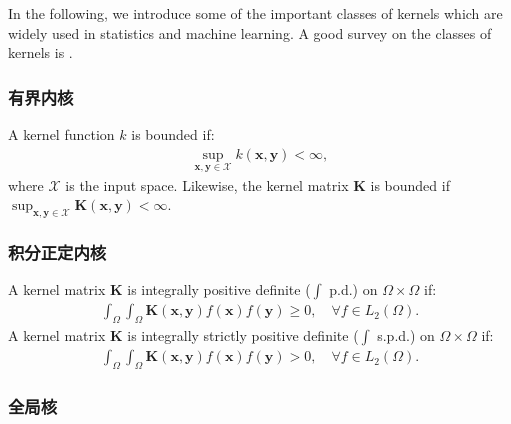 \documentclass[lang=cn,10pt]{gorgeousnbook}
\numberwithin{equation}{section}%
\numberwithin{figure}{section}%
\begin{document}
In the following, we introduce some of the important classes of kernels which are widely used in statistics and machine learning. A good survey on the classes of kernels is \cite{genton2001classes}.


\subsubsection{有界内核}

\begin{definition}
A kernel function $k$ is bounded if:
\begin{align}
\sup_{\boldsymbol{x}, \boldsymbol{y} \in \mathcal{X}} k(\boldsymbol{x}, \boldsymbol{y}) < \infty, 
\end{align}
where $\mathcal{X}$ is the input space. Likewise, the kernel matrix $\boldsymbol{K}$ is bounded if $\sup_{\boldsymbol{x}, \boldsymbol{y} \in \mathcal{X}} \boldsymbol{K}(\boldsymbol{x}, \boldsymbol{y}) < \infty$.
\end{definition}

\subsubsection{积分正定内核} \label{section_integrally_positive_definite_kernels}

\begin{definition}
A kernel matrix $\boldsymbol{K}$ is integrally positive definite ($\int$ p.d.) on $\Omega \times \Omega$ if:
\begin{align}
\int_\Omega \int_\Omega \boldsymbol{K}(\boldsymbol{x}, \boldsymbol{y}) f(\boldsymbol{x}) f(\boldsymbol{y}) \geq 0, \quad \forall f \in L_2(\Omega).
\end{align}
A kernel matrix $\boldsymbol{K}$ is integrally strictly positive definite ($\int$ s.p.d.) on $\Omega \times \Omega$ if:
\begin{align}
\int_\Omega \int_\Omega \boldsymbol{K}(\boldsymbol{x}, \boldsymbol{y}) f(\boldsymbol{x}) f(\boldsymbol{y}) > 0, \quad \forall f \in L_2(\Omega).
\end{align}
\end{definition}



\subsubsection{全局核} \label{section_universal_kernels}
\end{document}

